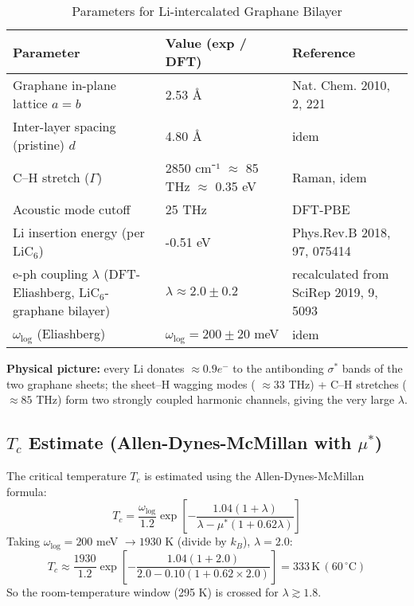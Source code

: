 \documentclass[11pt,a4paper]{article}
\begin{document}
\begin{table}[htbp]
\centering
\caption{Parameters for Li-intercalated Graphane Bilayer}
\label{tab:graphane_parameters}
\begin{tabularx}{\textwidth}{X X X}
\toprule
\textbf{Parameter} & \textbf{Value (exp / DFT)} & \textbf{Reference} \\
\midrule
Graphane in-plane lattice 
$a=b$ & 2.53 Å & Nat. Chem. 2010, 2, 221 \\
Inter-layer spacing (pristine) 
$d$ & 4.80 Å & idem \\
C–H stretch ($\Gamma$) & 2850 cm⁻¹ 
$\approx$ 85 THz 
$\approx$ 0.35 eV & Raman, idem \\
Acoustic mode cutoff & 25 THz & DFT-PBE \\
Li insertion energy (per LiC$_6$) & -0.51 eV & Phys.Rev.B 2018, 97, 075414 \\
e-ph coupling 
$\lambda$ (DFT-Eliashberg, LiC$_6$-graphane bilayer) & 
$\lambda \approx 2.0 \pm 0.2$ & recalculated from SciRep 2019, 9, 5093 \\
$\omega_{\text{log}}$ (Eliashberg) & 
$\omega_{\text{log}} = 200 \pm 20$ meV & idem \\
\bottomrule
\end{tabularx}
\end{table}

\textbf{Physical picture:} every Li donates 
$\approx 0.9 e^-$ to the antibonding 
$\sigma^*$ bands of the two graphane sheets; the sheet–H wagging modes (
$\approx 33$ THz) + C–H stretches (
$\approx 85$ THz) form two strongly coupled harmonic channels, giving the very large 
$\lambda$.

\subsection{\texorpdfstring{$T_c$ Estimate (Allen-Dynes-McMillan with $\mu^*$)}{Tc Estimate (Allen-Dynes-McMillan with mu*)}}
\label{subsec:tc_estimate}
The critical temperature 
$T_c$ is estimated using the Allen-Dynes-McMillan formula:
\begin{equation}
T_c = \frac{\omega_{\text{log}}}{1.2} \exp\left[-\frac{1.04(1+\lambda)}{\lambda-\mu^{*}(1+0.62\lambda)}\right]
\end{equation}
Taking 
$\omega_{\text{log}} = 200$ meV 
$\rightarrow 1930$ K (divide by 
$k_B$), 
$\lambda=2.0$:
\begin{equation}
T_c \approx \frac{1930}{1.2} \exp\left[-\frac{1.04(1+2.0)}{2.0-0.10(1+0.62 \times 2.0)}\right] = 333\,\text{K} \,(60\,^{\circ}\text{C})
\end{equation}
So the room-temperature window (295 K) is crossed for 
$\lambda \gtrsim 1.8$.
\end{document}
